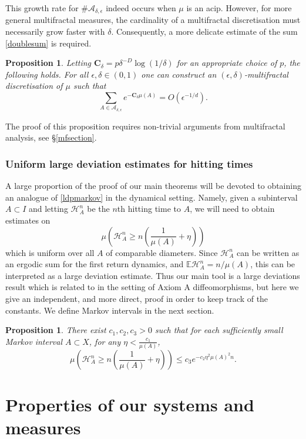 \documentclass[11pt, reqno]{amsart}
\numberwithin{equation}{section}
\theoremstyle{plain}%
\newtheorem{prop}[thm]{Proposition}
\theoremstyle{definition}
\def\A{\ensuremath{\mathscr A}}
\renewcommand{\H}{\mathcal{H}}
\renewcommand{\A}{\mathcal{A}}
\theoremstyle{nonumberplain}
\begin{document}
This growth rate for $\# \A_{\delta,\epsilon}$ indeed occurs when $\mu$ is an acip.
However, for more general multifractal measures, the cardinality of a multifractal
discretisation must necessarily grow faster with $\delta$.
Consequently, a more delicate estimate of the sum
\eqref{doublesum} is required.

\begin{prop}\label{prop:mftoolintro}
Letting  $\mathbf{C}_\delta= p\delta^{-D}\log(1/\delta)$ for an appropriate choice of $p$, the following holds.  For all $\epsilon,\delta \in (0,1)$ one can construct an
$(\epsilon,\delta)$-multifractal discretisation of $\mu$ such that
\[
\sum_{A \in \mathcal{A}_{\delta,\epsilon}}
  e^{-\mathbf{C}_\delta \mu(A)}
  = O(\epsilon^{-1/d}).
\]
\end{prop}

The proof of this proposition requires non-trivial arguments from
multifractal analysis, see \S \ref{mfsection}.

\subsubsection{Uniform large deviation estimates for hitting times}
A large proportion of the proof of our main theorems will be devoted to obtaining an analogue of \eqref{ldpmarkov} in the dynamical setting. Namely, given a subinterval $A \subset I$ and letting $\H_A^n$ be the $n$th hitting time to $A$, we will need to obtain estimates on
$$ \mu\left( \H_A^{n } \geq n\left(\frac{1}{\mu(A)}+\eta\right)\right)$$
which is uniform over all $A$ of comparable diameters. Since $\H_A^n$ can be written as an ergodic sum for the first return dynamics, and $\mathbb{E} \H_A^n=n/\mu(A)$, this can be interpreted as a large deviation estimate. Thus our main tool is a large deviations result which is  related to \cite[Theorem 2.2]{ChaLep05} in the setting of Axiom A diffeomorphisms, but here we give an independent, and more direct, proof in order to keep track of the constants. We define Markov intervals in the next section.

\begin{prop}
There exist $c_1,c_2, c_3>0$ such that for each sufficiently small Markov interval $A\subset X$,  for any $\eta<\frac{c_1}{\mu(A)}$,
$$ \mu\left( \H_A^{n } \geq n\left(\frac{1}{\mu(A)}+\eta\right)\right)\le c_3e^{-c_2\eta^2\mu(A)^2n}.$$
\label{prop:ChaLep}
\end{prop}


\section{Properties of our systems and measures}\label{section:properties}
\end{document}

